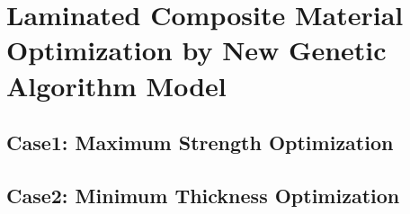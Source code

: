 
\chapter{Laminated Composite Material Optimization by New Genetic Algorithm Model} %

\label{Chapter4} %

\section{Case1: Maximum Strength Optimization}








\section{Case2: Minimum Thickness Optimization}









